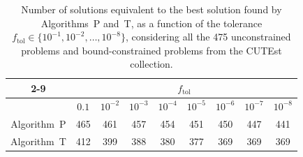 \documentclass[11pt]{article}
\newcommand{\ftol}{f_{\mathrm{tol}}}
\begin{document}
\begin{table}[ht!]
\begin{center}
{\small
\begin{tabular}{ccccccccc}
\cline{2-9}
& \multicolumn{8}{c}{$\ftol$} \\ 
\hline
& $0.1$ & $10^{-2}$ & $10^{-3}$ & $10^{-4}$ & $10^{-5}$ & $10^{-6}$ & $10^{-7}$ & $10^{-8}$ \\
\hline
Algorithm~P & 465 & 461 & 457 & 454 & 451 & 450 & 447 & 441 \\
Algorithm~T & 412 & 399 & 388 & 380 & 377 & 369 & 369 & 369 \\
\hline
\end{tabular}}
\end{center}
\caption{Number of solutions equivalent to the best solution found by Algorithms~P and~T, as a function of the tolerance $\ftol \in \{10^{-1}, 10^{-2} ,\dots,10^{-8}\}$, considering all the 475 unconstrained problems and bound-constrained problems from the CUTEst collection.}
\label{tab:spg-cr}
\end{table}
\end{document}
